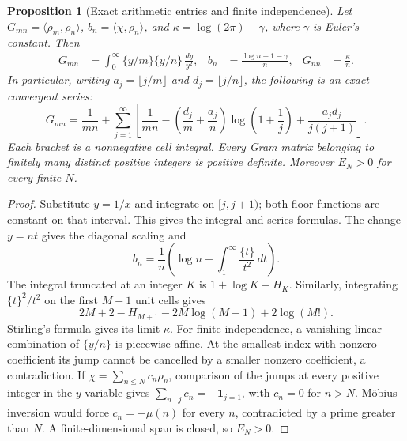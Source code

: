 \documentclass[11pt]{article}
\newtheorem{proposition}[theorem]{Proposition}
\theoremstyle{remark}
\begin{document}
\begin{proposition}[Exact arithmetic entries and finite independence]
\label{prop:ns53-nb-entries}
Let $G_{mn}=\langle\rho_m,\rho_n\rangle$, $b_n=\langle\chi,\rho_n\rangle$,
and $\kappa=\log(2\pi)-\gamma$, where $\gamma$ is Euler's constant.
Then
\begin{align}
 G_{mn}&=\int_0^\infty\{y/m\}\{y/n\}\,\frac{dy}{y^2},
 & b_n&=\frac{\log n+1-\gamma}{n},
 &G_{nn}&=\frac{\kappa}{n}.\label{eq:ns53-nb-entries}
\end{align}
In particular, writing $a_j=\lfloor j/m\rfloor$ and
$d_j=\lfloor j/n\rfloor$, the following is an exact convergent series:
\begin{equation}
 G_{mn}=\frac1{mn}+\sum_{j=1}^{\infty}
 \left[\frac1{mn}-\left(\frac{d_j}{m}+\frac{a_j}{n}\right)
 \log\left(1+\frac1j\right)+\frac{a_jd_j}{j(j+1)}\right].
 \label{eq:ns53-nb-gram-series}
\end{equation}
Each bracket is a nonnegative cell integral. Every Gram matrix belonging
to finitely many distinct positive integers is positive definite.
Moreover $E_N>0$ for every finite $N$.
\end{proposition}

\begin{proof}
Substitute $y=1/x$ and integrate on $[j,j+1)$; both floor functions
are constant on that interval. This gives the integral and series formulas.
The change $y=nt$ gives the diagonal scaling and
\[
 b_n=\frac1n\left(\log n+\int_1^\infty\frac{\{t\}}{t^2}\,dt\right).
\]
The integral truncated at an integer $K$ is $1+\log K-H_K$.
Similarly, integrating $\{t\}^2/t^2$ on the first $M+1$ unit cells gives
\[
 2M+2-H_{M+1}-2M\log(M+1)+2\log(M!).
\]
Stirling's formula gives its limit $\kappa$. For finite independence,
a vanishing linear combination of $\{y/n\}$ is piecewise affine.
At the smallest index with nonzero coefficient its jump cannot be
cancelled by a smaller nonzero coefficient, a contradiction. If
$\chi=\sum_{n\leq N}c_n\rho_n$, comparison of the jumps at every positive
integer in the $y$ variable gives
$\sum_{n\mid j}c_n=-\mathbf 1_{j=1}$, with $c_n=0$ for $n>N$.
M\"obius inversion would force $c_n=-\mu(n)$ for every $n$, contradicted
by a prime greater than $N$. A finite-dimensional span is closed, so
$E_N>0$.
\end{proof}
\end{document}
